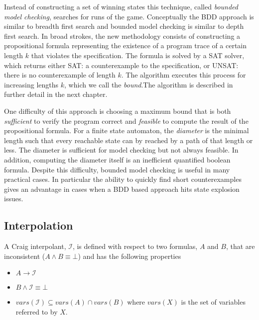 Instead of constructing a set of winning states this technique, called \emph{bounded model checking}, searches for runs of the game. Conceptually the BDD approach is similar to breadth first search and bounded model checking is similar to depth first search. In broad strokes, the new methodology consists of constructing a propositional formula representing the existence of a program trace of a certain length $k$ that violates the specification. The formula is solved by a SAT solver, which returns either SAT: a counterexample to the specification, or UNSAT: there is no counterexample of length $k$. The algorithm executes this process for increasing lengths $k$, which we call the \emph{bound}.The algorithm is described in further detail in the next chapter.

One difficulty of this approach is choosing a maximum bound that is both \emph{sufficient} to verify the program correct and \emph{feasible} to compute the result of the propositional formula. For a finite state automaton, the \emph{diameter} is the minimal length such that every reachable state can by reached by a path of that length or less. The diameter is sufficient for model checking but not always feasible. In addition, computing the diameter itself is an inefficient quantified boolean formula. Despite this difficulty, bounded model checking is useful in many practical cases. In particular the ability to quickly find short counterexamples gives an advantage in cases when a BDD based approach hits state explosion issues.

\subsection{Interpolation}
\label{sec:backgroundInterpolation}

A Craig interpolant, $\mathcal{I}$, is defined with respect to two formulas, $A$ and $B$, that are inconsistent ($A \land B \equiv \bot$) and has the following properties

\begin{itemize}
    \item $A \to \mathcal{I}$
    \item $B \land \mathcal{I} \equiv \bot$
    \item $vars(\mathcal{I}) \subseteq vars(A) \cap vars(B)$ where $vars(X)$ is the set of variables referred to by $X$.
\end{itemize}

